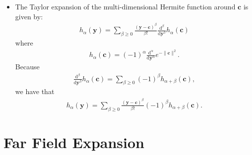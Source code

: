 \documentclass[10pt]{article}
\newcommand{\dee}{\mathrm{d}}
\newcommand{\ve}[1]{\mathbf{#1}}
\begin{document}
\begin{itemize}
  \item The Taylor expansion of the multi-dimensional Hermite function around $\ve{c}$ is given by:
  \begin{align*}
    h_\alpha(\ve{y}) = \sum_{\beta \geq 0} \frac{(\ve{y}-\ve{c})^\beta}{\beta!}\frac{\dee^\beta}{\dee \ve{y}^\beta} h_\alpha(\ve{c})
  \end{align*}
  where
  \begin{align*}
    h_\alpha(\ve{c}) = (-1)^\alpha \frac{\dee^\alpha}{\dee \ve{y}^\alpha} e^{-\|\ve{c}\|^2}.
  \end{align*}
  Because
  \begin{align*}
    \frac{\dee^\beta}{\dee \ve{y}^\beta} h_\alpha(\ve{c}) = \sum_{\beta \geq 0} (-1)^\beta h_{\alpha + \beta}(\ve{c}),
  \end{align*}
  we have that
  \begin{align*}
    h_\alpha(\ve{y}) = \sum_{\beta \geq 0} \frac{(\ve{y}-\ve{c})^\beta}{\beta!} (-1)^\beta h_{\alpha + \beta}(\ve{c}).
  \end{align*}
\end{itemize}

\section{Far Field Expansion}\label{sec:far_field_expansion} %
\end{document}
